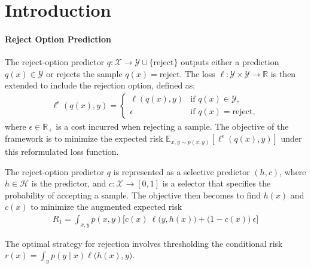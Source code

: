 

\section{Introduction}
\paragraph{Reject Option Prediction}

The reject-option predictor $q: \mathcal{X} \rightarrow \mathcal{Y} \cup \{ \text{reject} \}$ outputs either a prediction $q(x)\in\mathcal{Y}$ or rejects the sample $q(x)=\text{reject}$. The loss $\ell: \mathcal{Y}\times\mathcal{Y}\rightarrow \mathbb{R}$ is then extended to include the rejection option, defined as:
\begin{align}
\ell^\epsilon(q(x), y) = 
\begin{cases}
\ell(q(x), y) & \text{if } q(x)\in\mathcal{Y},\\
\epsilon & \text{if } q(x)=\text{reject},
\end{cases}
\end{align}
where $\epsilon \in\mathbb{R}_+$ is a cost incurred when rejecting a sample. The objective of the framework is to minimize the expected risk $\mathbb{E}_{x,y\sim p(x,y)}[\ell^\epsilon(q(x), y)]$ under this reformulated loss function. 

The reject-option predictor $q$ is represented as a selective predictor $(h,c)$, where $h\in \mathcal{H}$ is the predictor, and $c: \mathcal{X}\rightarrow [0, 1]$ is a selector that specifies the probability of accepting a sample. The objective then becomes to find $h(x)$ and $c(x)$ to minimize the augmented expected risk
\begin{align}
R_{1} = \int_{x,y}p(x,y) \bigg[ c(x)\ \ell\big(y, h(x)\big) + \big(1-c(x)\big)\ \epsilon\bigg]
\end{align}

The optimal strategy for rejection involves thresholding the conditional risk $r(x)=\int_{y}p(y\mid x)\ell\big(h(x), y\big)$.

